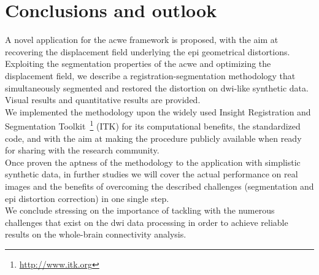 \section{Conclusions and outlook}
\label{sec:conclusion}
%
A novel application for the \gls{acwe} framework is proposed,
with the aim at recovering the displacement field underlying 
the \gls{epi} geometrical distortions. Exploiting the segmentation
properties of the \gls{acwe} and optimizing the displacement
field, we describe a registration-segmentation methodology that
simultaneously segmented and restored the distortion on 
\gls{dwi}-like synthetic data. Visual results and quantitative
results are provided. \\

We implemented the methodology upon the widely used
Insight Registration and Segmentation 
Toolkit~\footnote{\url{http://www.itk.org}} (ITK)
for its computational benefits, the standardized code, and 
with the aim at making the procedure publicly available 
when ready for sharing with the research community.\\

Once proven the aptness of the methodology to the application
with simplistic synthetic data, in further studies we will 
cover the actual performance on real images and the benefits 
of overcoming the described challenges (segmentation and 
\gls{epi} distortion correction) in one single step.\\

We conclude stressing on the importance of tackling with
the numerous challenges that exist on the \gls{dwi} data 
processing in order to achieve reliable results on the
whole-brain connectivity analysis.
